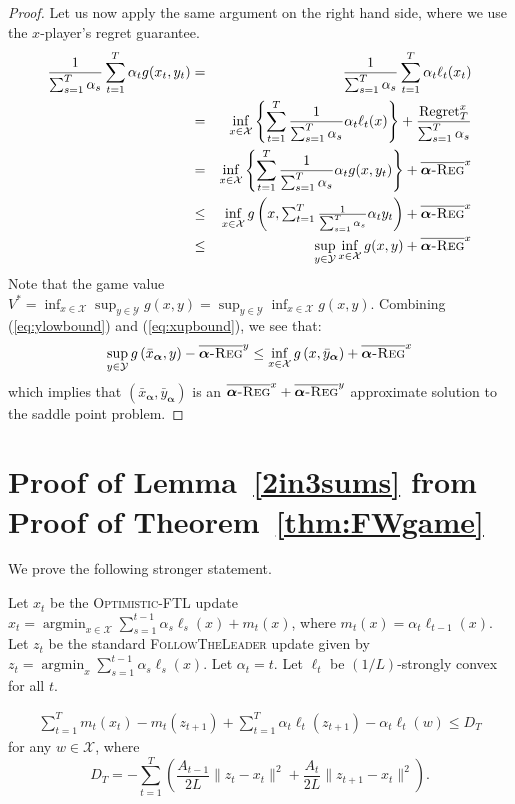 \documentclass[pmlr]{jmlr} %
\def\argmin{\mathop{\arg\min}}
\def\balpha{\boldsymbol{\alpha}}
\def\FTL{\textsc{FollowTheLeader}\xspace}
\def\OFTL{\textsc{Optimistic-FTL}\xspace}
\newcommand{\avgregret}[1]{\overline{\balpha\textsc{-Reg}}^{#1}}
\newcommand{\XX}{\mathcal{X}}
\newcommand{\YY}{\mathcal{Y}}
\newcommand{\pr}[1]{\left(#1\right)}
\begin{document}
\begin{proof}
Let us now apply the same argument on the right hand side, where we use the $x$-player's regret guarantee.
\begin{eqnarray}
\frac{1}{\sum_{s=1}^{T} \alpha_{s}}  \sum_{t=1}^{T}  \alpha_{t} g(x_{t}, y_{t}) & = & \frac{1}{\sum_{s=1}^{T} \alpha_{s}} \sum_{t=1}^{T}  \alpha_{t} \ell_{t}(x_{t}) \notag \\
  & = & \inf_{x \in \XX} \left\{ 
    \sum_{t=1}^{T} \frac{1}{\sum_{s=1}^{T} \alpha_{s}} \alpha_{t} \ell_{t}(x) \right \} + \frac{ \text{Regret}_{T}^{x} }{  \sum_{s=1}^{T} \alpha_{s} }  \notag \\
  & = & \inf_{x \in \XX} \left\{  \sum_{t=1}^{T} \frac{1}{\sum_{s=1}^{T} \alpha_{s}} \alpha_{t} g(x, y_{t}) \right \} + \avgregret{x} \notag \\
  & \leq & \inf_{x \in \XX}  
    g\left(x,{ \textstyle \sum_{t=1}^{T} \frac{1}{\sum_{s=1}^{T} \alpha_{s}} \alpha_{t} y_{t}}\right) + \avgregret{x} 
    \label{eq:xupbound} \\
  & \leq & \sup_{y \in \YY} \inf_{x \in \XX}  g(x,y) + \avgregret{x}  \notag
\end{eqnarray}
Note that the game value $V^{*}= \inf_{x \in \XX} \sup_{y \in \YY} g(x,y) = \sup_{y \in \YY} \inf_{x \in \XX}  g(x,y)$.
Combining (\ref{eq:ylowbound}) and (\ref{eq:xupbound}), we see that:
\begin{align*}
    \sup_{y \in \YY} g\left({\textstyle \bar{x}_{\balpha}}, y \right)  - \avgregret{y}  \le \inf_{x \in \XX}  
g\left(x,{ \textstyle \bar{y}_{\balpha}}\right) + \avgregret{x} 
\end{align*}
which implies that $(\bar{x}_{\balpha}, \bar{y}_{\balpha})$ is an $\avgregret{x} + \avgregret{y} $ approximate solution to the saddle point problem.
\end{proof}


\section{Proof of Lemma~\ref{2in3sums} from Proof of Theorem~\ref{thm:FWgame}} \label{app:2in3sums}
We prove the following stronger statement.
\begin{lemma}\label{2in3sums}	
Let $x_{t}$ be the \OFTL update	$x_{t} = \argmin_{x \in \XX} \sum_{s=1}^{t-1} \alpha_{s} \ell_{s}(x) + m_{t}(x)$,
	where $m_{t}(x) = \alpha_{t} \ell_{{t-1}}(x)$. Let $z_{t}$ be the standard \FTL update given by $z_{t} = \argmin_{x} \sum_{s=1}^{t-1} \alpha_{s} \ell_{s}(x)$. Let $\alpha_{t} = t$. Let $\ell_{t}$ be $(1/L)$-strongly convex for all $t$.
	
	
		
\begin{equation} \label{bound:2sums}
\begin{aligned}
 \sum_{t=1}^{T} m_{t}(x_{t}) - m_{t}(z_{t+1}) + \sum_{t=1}^{T} \alpha_{t} \ell_{t}(z_{t+1}) - \alpha_{t} \ell_{t}(w)
 \leq D_{T}
\end{aligned}
\end{equation}
for any $w \in \XX$, where \[D_{T}= -\sum_{t=1}^{T} \pr{\frac{A_{t-1}}{2L} \| z_{t} - x_{t}\|^{2} 
+ \frac{A_{t}}{2L} \| z_{t+1} - x_{t}\|^{2}}.\] 
\end{lemma}
\end{document}
